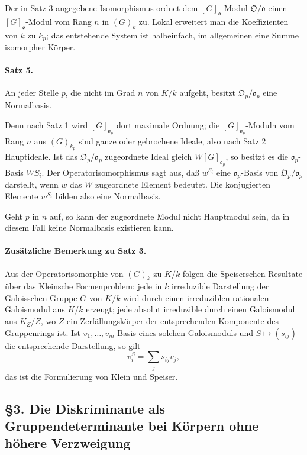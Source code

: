 \documentclass[11pt]{article}
\providecommand{\frako}{\mathfrak o}
\providecommand{\frakO}{\mathfrak O}
\begin{document}
Der in Satz 3 angegebene Isomorphismus ordnet dem \([G]_{\frako}\)-Modul \(\frakO/\frako\) einen \([G]_{\frako}\)-Modul vom Rang \(n\) in \((G)_k\) zu. Lokal erweitert man die Koeffizienten von \(k\) zu \(k_p\); das entstehende System ist halbeinfach, im allgemeinen eine Summe isomorpher Körper.

\paragraph{Satz 5.}
An jeder Stelle \(p\), die nicht im Grad \(n\) von \(K/k\) aufgeht, besitzt \(\frakO_p/\frako_p\) eine Normalbasis.

Denn nach Satz 1 wird \([G]_{\frako_p}\) dort maximale Ordnung; die \([G]_{\frako_p}\)-Moduln vom Rang \(n\) aus \((G)_{k_p}\) sind ganze oder gebrochene Ideale, also nach Satz 2 Hauptideale. Ist das \(\frakO_p/\frako_p\) zugeordnete Ideal gleich \(W[G]_{\frako_p}\), so besitzt es die \(\frako_p\)-Basis \(WS_i\). Der Operatorisomorphismus sagt aus, daß \(w^{S_i}\) eine \(\frako_p\)-Basis von \(\frakO_p/\frako_p\) darstellt, wenn \(w\) das \(W\) zugeordnete Element bedeutet. Die konjugierten Elemente \(w^{S_i}\) bilden also eine Normalbasis.

Geht \(p\) in \(n\) auf, so kann der zugeordnete Modul nicht Hauptmodul sein, da in diesem Fall keine Normalbasis existieren kann.

\paragraph{Zusätzliche Bemerkung zu Satz 3.}
Aus der Operatorisomorphie von \((G)_k\) zu \(K/k\) folgen die Speiserschen Resultate über das Kleinsche Formenproblem: jede in \(k\) irreduzible Darstellung der Galoisschen Gruppe \(G\) von \(K/k\) wird durch einen irreduziblen rationalen Galoismodul aus \(K/k\) erzeugt; jede absolut irreduzible durch einen Galoismodul aus \(K_Z/Z\), wo \(Z\) ein Zerfällungskörper der entsprechenden Komponente des Gruppenrings ist. Ist \(v_1,\ldots,v_m\) Basis eines solchen Galoismoduls und \(S\mapsto (s_{ij})\) die entsprechende Darstellung, so gilt
\[
        v_i^S=\sum_j s_{ij}v_j,
\]
das ist die Formulierung von Klein und Speiser.

\subsection*{§3. Die Diskriminante als Gruppendeterminante bei Körpern ohne höhere Verzweigung}
\end{document}
